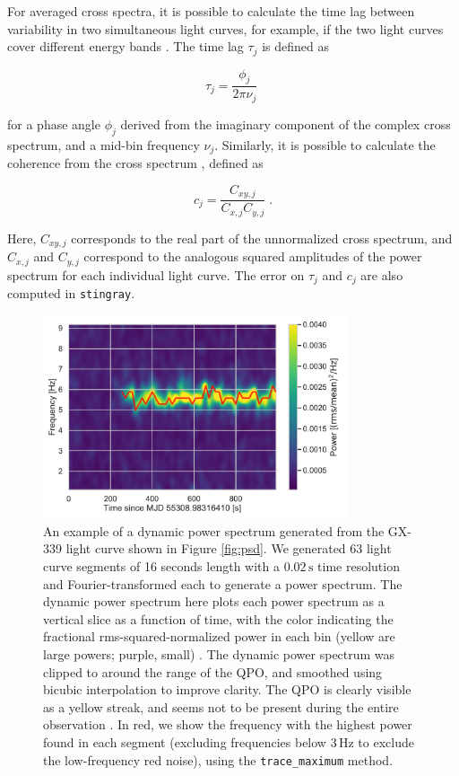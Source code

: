 \documentclass[twocolumn]{aastex62}
\newcommand{\stingray}{\texttt{stingray}\xspace}
\begin{document}
For averaged cross spectra, it is possible to calculate the time lag between variability in two simultaneous light curves, for example, if the two light curves cover different energy bands \citep{Vaughanetal94}. 
The time lag $\tau_j$ is defined as

\[
\tau_j = \frac{\phi_j}{2\pi\nu_j} \; 
\]

\noindent for a phase angle $\phi_j$ derived from the imaginary component of the complex cross spectrum, and a mid-bin frequency $\nu_j$. 
Similarly, it is possible to calculate the coherence from the cross spectrum \citep{vaughan1997,nowak1999}, defined as 

\begin{equation}
c_j = \frac{C_{xy,j}}{C_{x,j} C_{y,j}} \; . 
\end{equation}

\noindent Here, $C_{xy,j}$ corresponds to the real part of the unnormalized cross spectrum, and $C_{x,j}$ and $C_{y,j}$ correspond to the analogous squared amplitudes of the power spectrum for each individual light curve. 
The error on $\tau_j$ and $c_j$ are also computed in \stingray.

\begin{figure}[htbp]
\begin{center}
\includegraphics[width=9cm]{../figures/dyn_spec.pdf}
\caption{An example of a dynamic power spectrum generated from the GX-339 light curve shown in Figure \ref{fig:psd}. 
We generated 63 light curve segments of 16 seconds length with a $0.02\,\mathrm{s}$ time resolution and Fourier-transformed each to generate a power spectrum. 
The dynamic power spectrum here plots each power spectrum as a vertical slice as a function of time, with the color indicating the fractional rms-squared-normalized power in each bin (yellow are large powers; purple, small) . 
The dynamic power spectrum was clipped to around the range of the QPO, and smoothed using bicubic interpolation to improve clarity. 
The QPO is clearly visible as a yellow streak, and seems not to be present during the entire observation \citep[consistent with][]{belloni2005}. 
In red, we show the frequency with the highest power found in each segment (excluding frequencies below $3\,\mathrm{Hz}$ to exclude the low-frequency red noise), using the \texttt{trace\_maximum} method.}
\label{fig:dynspec}
\end{center}
\end{figure}
\end{document}
